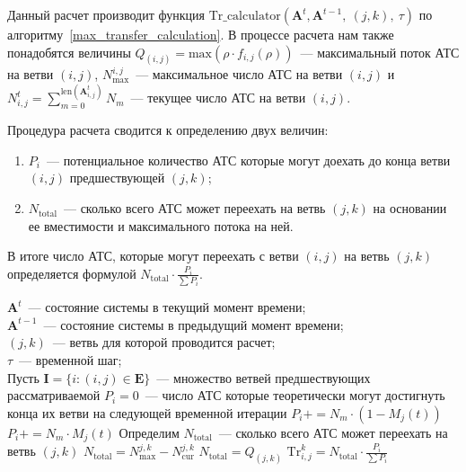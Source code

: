 Данный расчет производит функция $\text{Tr\_calculator}(\mathbf{A}^t, \mathbf{A}^{t-1},\ (j,k),\ \tau)$ по алгоритму~\ref{max_transfer_calculation}.
В процессе расчета нам также понадобятся величины $Q_(i,j) = \text{max}(\rho\cdot f_{i,j}(\rho))$~--- максимальный поток АТС на ветви $(i,j)$,
$N^{i,j}_\text{max}$~--- максимальное число АТС на ветви $(i,j)$ и $N^t_{i,j} = \sum_{m=0}^{\text{len}(\mathbf{A}^t_{i,j})} N_m$~--- текущее число АТС на ветви $(i,j)$.

Процедура расчета сводится к определению двух величин:
\begin{enumerate}[label=\arabic*),ref=\arabic*]
  \item $P_i$~--- потенциальное количество АТС которые могут доехать до конца ветви $(i,j)$ предшествующей $(j,k)$;
  \item $N_\text{total}$~--- сколько всего АТС может переехать на ветвь $(j,k)$ на основании ее вместимости и максимального потока на ней.
\end{enumerate}
В итоге число АТС, которые могут переехать с ветви $(i,j)$ на ветвь $(j,k)$ определяется формулой $N_\text{total} \cdot \frac{P_i}{\sum P_i}$.


    \begin{algorithmic}
        \REQUIRE $\mathbf{A}^t$~--- состояние системы в текущий момент времени; \\
                 $\mathbf{A}^{t-1}$~--- состояние системы в предыдущий момент времени; \\
                 $(j,k)$~--- ветвь для которой проводится расчет; \\
                 $\tau$~--- временной шаг; \\
        \STATE Пусть $\mathbf{I} = \{i : (i,j) \in \mathbf{E}\}$~--- множество ветвей предшествующих рассматриваемой
            \STATE $P_i = 0$~--- число АТС которые теоретически могут достигнуть конца их ветви на следующей временной итерации
                        \STATE $P_i += N_m \cdot (1 - M_j(t))$
                    \ELSE
                        \STATE $P_i += N_m \cdot M_j(t)$
                    \ENDIF
                \ENDIF
            \ENDFOR
        \ENDFOR
        \STATE Определим $N_\text{total}$~--- сколько всего АТС может переехать на ветвь $(j,k)$
            \STATE $N_\text{total} = N^{j,k}_\text{max} - N^{j,k}_\text{cur}$
        \ELSE
            \STATE $N_\text{total} = Q_(j,k)$
        \ENDIF
            \STATE $\text{Tr}_{i, j}^k = N_\text{total} \cdot \frac{P_i}{\sum P_i}$
        \ENDFOR
    \end{algorithmic}


